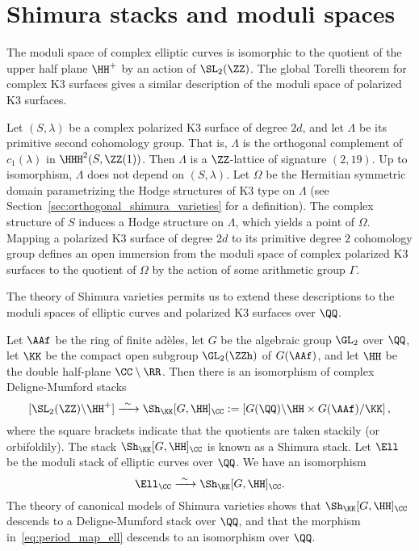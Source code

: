 \section{Shimura stacks and moduli spaces}\label{sec:intro_second}
The moduli space of complex elliptic curves is isomorphic to the quotient of the upper half plane $\HH^+$ by an action of $\SL_2(\ZZ)$. The global Torelli theorem for complex K3 surfaces gives a similar description of the moduli space of polarized K3 surfaces.

Let $(S,\lambda)$ be a complex polarized K3 surface of degree $2d$, and let $\Lambda$ be its primitive second cohomology group. That is, $\Lambda$ is the orthogonal complement of $c_1(\lambda)$ in $\HHH^2(S,\ZZ(1))$. Then $\Lambda$ is a $\ZZ$-lattice of signature $(2,19)$. Up to isomorphism, $\Lambda$ does not depend on $(S,\lambda)$. Let $\Omega$ be the Hermitian symmetric domain parametrizing the Hodge structures of K3 type on $\Lambda$ (see Section~\ref{sec:orthogonal_shimura_varieties} for a definition). The complex structure of $S$ induces a Hodge structure on $\Lambda$, which yields a point of $\Omega$. Mapping a polarized K3 surface of degree $2d$ to its primitive degree $2$ cohomology group defines an open immersion from the moduli space of complex polarized K3 surfaces to the quotient of $\Omega$ by the action of some arithmetic group $\Gamma$.

The theory of Shimura varieties permits us to extend these descriptions to the moduli spaces of elliptic curves and polarized K3 surfaces over $\QQ$.

Let $\AAf$ be the ring of finite ad\`eles, let $G$ be the algebraic group $\GL_2$ over $\QQ$, let $\KK$ be the compact open subgroup $\GL_2(\ZZh)$ of $G(\AAf)$, and let $\HH$ be the double half-plane $\CC \setminus \RR$. Then there is an isomorphism of complex Deligne-Mumford stacks
$$
  [\SL_2(\ZZ) \backslash \HH^+] \xrightarrow{\ \sim \ } \Sh_{\KK}[G, \HH]_{\CC} := \left[ G(\QQ) \backslash \HH \times G(\AAf) / \KK\right],
$$
where the square brackets indicate that the quotients are taken stackily (or orbifoldily). The stack $\Sh_{\KK}[G,\HH]_{\CC}$ is known as a Shimura stack. Let $\Ell$ be the moduli stack of elliptic curves over $\QQ$. We have an isomorphism
\begin{equation}\label{eq:period_map_ell}
\Ell_{\CC} \xrightarrow{\ \sim \ } \Sh_{\KK}[G, \HH]_{\CC}.
\end{equation}
The theory of canonical models of Shimura varieties shows that $\Sh_{\KK}[G,\HH]_{\CC}$ descends to a Deligne-Mumford stack over $\QQ$, and that the morphism in~\eqref{eq:period_map_ell} descends to an isomorphism over $\QQ$.


